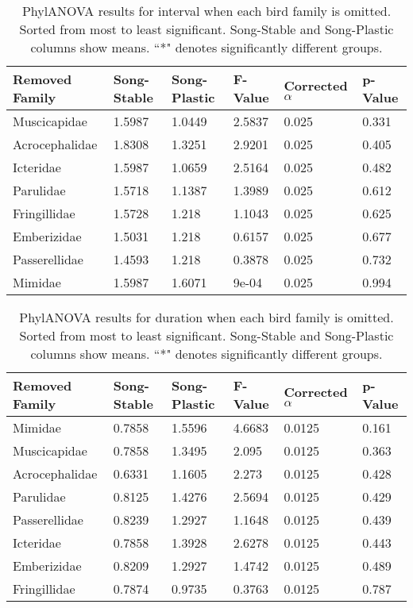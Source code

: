 \documentclass[a4paper,12pt]{article}
\begin{document}
\begin{table}[ht]
\caption{PhylANOVA results for interval when each bird family is omitted.  Sorted from most to least significant.  Song-Stable and Song-Plastic columns show means.  ``*" denotes significantly different groups.}
\centering
\begin{tabular}{llllll}
  \hline
Removed Family & Song-Stable & Song-Plastic & F-Value & Corrected $\alpha$ & p-Value \\ 
  \hline
Muscicapidae & 1.5987 & 1.0449 & 2.5837 & 0.025 & 0.331 \\ 
  Acrocephalidae & 1.8308 & 1.3251 & 2.9201 & 0.025 & 0.405 \\ 
  Icteridae & 1.5987 & 1.0659 & 2.5164 & 0.025 & 0.482 \\ 
  Parulidae & 1.5718 & 1.1387 & 1.3989 & 0.025 & 0.612 \\ 
  Fringillidae & 1.5728 & 1.218 & 1.1043 & 0.025 & 0.625 \\ 
  Emberizidae & 1.5031 & 1.218 & 0.6157 & 0.025 & 0.677 \\ 
  Passerellidae & 1.4593 & 1.218 & 0.3878 & 0.025 & 0.732 \\ 
  Mimidae & 1.5987 & 1.6071 & 9e-04 & 0.025 & 0.994 \\ 
   \hline
\end{tabular}
\end{table}

\begin{table}[ht]
\centering
\caption{PhylANOVA results for duration when each bird family is omitted.  Sorted from most to least significant.  Song-Stable and Song-Plastic columns show means.  ``*" denotes significantly different groups.}
\begin{tabular}{llllll}
  \hline
Removed Family & Song-Stable & Song-Plastic & F-Value & Corrected $\alpha$ & p-Value \\ 
  \hline
  Mimidae & 0.7858 & 1.5596 & 4.6683 & 0.0125 & 0.161 \\ 
  Muscicapidae & 0.7858 & 1.3495 & 2.095 & 0.0125 & 0.363 \\ 
  Acrocephalidae & 0.6331 & 1.1605 & 2.273 & 0.0125 & 0.428 \\ 
  Parulidae & 0.8125 & 1.4276 & 2.5694 & 0.0125 & 0.429 \\ 
  Passerellidae & 0.8239 & 1.2927 & 1.1648 & 0.0125 & 0.439 \\ 
  Icteridae & 0.7858 & 1.3928 & 2.6278 & 0.0125 & 0.443 \\ 
  Emberizidae & 0.8209 & 1.2927 & 1.4742 & 0.0125 & 0.489 \\ 
  Fringillidae & 0.7874 & 0.9735 & 0.3763 & 0.0125 & 0.787 \\ 
   \hline
\end{tabular}
\end{table}
\end{document}
